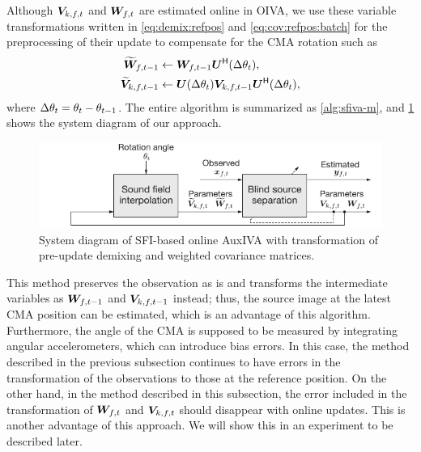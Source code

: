 \documentclass[sip,biber]{now-journal}
\begin{document}
Although $\cov _{\src,\ft}$ and $\Demix _{\ft}$ are estimated online in OIVA,
we use these variable transformations written in \eqref{eq:demix:refpos} and \eqref{eq:cov:refpos:batch} for the preprocessing of their update to compensate for the CMA rotation such as
\begin{align}
  \refpos{\Demix} _{\ft[-1]} &\gets \Demix _{\ft[-1]} \rotMat ^{\hermite} (\Delta \rotSpat _{\tframe}), \label{eq:sfiiva:demix} \\
  \refpos{\cov} _{\src,\ft[-1]} &\gets \rotMat (\Delta\rotSpat _{\tframe}) \cov _{\src,\ft[-1]} \rotMat ^{\hermite} (\Delta\rotSpat _{\tframe}), \label{eq:sfiiva:cov}
\end{align}
where $\Delta\theta _{t} = \theta _{t} - \theta _{t - 1}$.
The entire algorithm is summarized as \cref{alg:sfiva-m}, and \cref{fig:sfiiva-m} shows the system diagram of our approach.
\begin{figure}[t]
  \centering
  \includegraphics{figures/diagrams/sfiiva-m.pdf}%
  \caption{System diagram of SFI-based online AuxIVA with transformation of pre-update demixing and weighted covariance matrices.}%
  \label{fig:sfiiva-m}
\end{figure}
This method preserves the observation as is and transforms the intermediate variables as $\Demix _{\ft[-1]}$ and $\cov _{\src,\ft[-1]}$ instead;
thus, the source image at the latest CMA position can be estimated, which is an advantage of this algorithm.
Furthermore, the angle of the CMA is supposed to be measured by integrating angular accelerometers, which can introduce bias errors.
In this case, the method described in the previous subsection continues to have errors in the transformation of the observations to those at the reference position.
On the other hand, in the method described in this subsection, the error included in the transformation of $\Demix _{\ft}$ and $\cov _{\src,\ft}$ should disappear with online updates.
This is another advantage of this approach. We will show this in an experiment to be described later.
\end{document}

